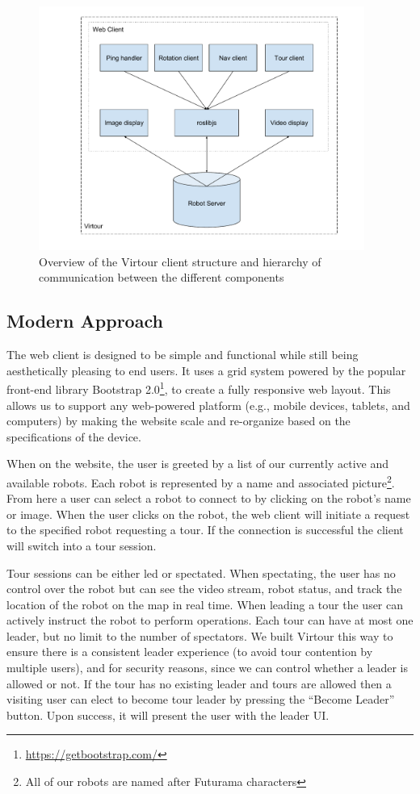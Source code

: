 \documentclass[
  oneside,
  11pt, a4paper,
  footinclude=true,
  headinclude=true,
  cleardoublepage=empty
]{article}
\begin{document}
\begin{figure}[t!]
  \centering
  \includegraphics[width=0.95\textwidth]{virtour_client}
  \caption{Overview of the Virtour client structure and hierarchy of
  communication between the different components}
  \label{fig:client}
\end{figure}


\subsection{Modern Approach}

The web client is designed to be simple and functional while still being
aesthetically pleasing to end users. It uses a grid system powered by the
popular front-end library Bootstrap
2.0\footnote{\url{https://getbootstrap.com/}}, to create a fully responsive web
layout. This allows us to support any web-powered platform (e.g., mobile
devices, tablets, and computers) by making the website scale and re-organize
based on the specifications of the device.

When on the website, the user is greeted by a list of our currently active and
available robots. Each robot is represented by a name and associated
picture\footnote{All of our robots are named after Futurama characters}. From
here a user can select a robot to connect to by clicking on the robot's name
or image. When the user clicks on the robot, the web client will initiate a
request to the specified robot requesting a tour. If the connection is
successful the client will switch into a tour session.

Tour sessions can be either led or spectated. When spectating, the user has no
control over the robot but can see the video stream, robot status, and track
the location of the robot on the map in real time. When leading a tour the user
can actively instruct the robot to perform operations. Each tour can have at
most one leader, but no limit to the number of spectators. We built Virtour
this way to ensure there is a consistent leader experience (to avoid tour
contention by multiple users), and for security reasons, since we can control
whether a leader is allowed or not. If the tour has no existing leader and
tours are allowed then a visiting user can elect to become tour leader by
pressing the ``Become Leader'' button. Upon success, it will present the user
with the leader UI.
\end{document}
